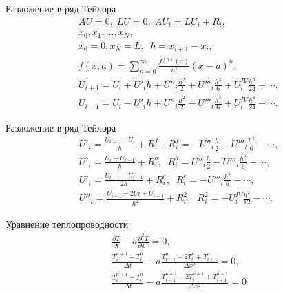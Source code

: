 \documentclass[12pt]{beamer}
\begin{document}
\begin{frame}{Разложение в ряд Тейлора}
\begin{eqnarray}
AU=0,\; LU=0,\; AU_{i}=LU_{i}+R_{i},\\
x_{0}, x_{1}, \dots, x_N,\\
x_{0}=0, x_N=L,\;\; h=x_{i+1}-x_{i},\\
f\left(x, a\right) = \sum\limits_{n=0}^{\infty} \frac{f^{\left(n\right)}\left(a\right)}{n!} \left(x - a\right)^n,\\
U_{i+1}=U_{i}+U'_{i}h+U''_{i}\frac{h^2}{2}+U'''_{i}\frac{h^3}{6}+U^{IV}_{i}\frac{h^4}{24}+\cdots,\\
U_{i-1}=U_{i}-U'_{i}h+U''_{i}\frac{h^2}{2}-U'''_{i}\frac{h^3}{6}+U^{IV}_{i}\frac{h^4}{24}-\cdots.
\end{eqnarray}
\end{frame}

\begin{frame}{Разложение в ряд Тейлора}
\begin{eqnarray}
U'_{i}=\frac{U_{i+1}-U_{i}}{h}+R^f_{i},\;\; R^f_{i}=-U''_{i}\frac{h}{2}-U'''_{i}\frac{h^2}{6}-\cdots,\\
U'_{i}=\frac{U_{i}-U_{i-1}}{h}+R^b_{i},\;\; R^b_{i}=U''_{i}\frac{h}{2}-U'''_{i}\frac{h^2}{6}-\cdots,\\
U'_{i}=\frac{U_{i+1}-U_{i-1}}{2h}+R^c_{i},\;\; R^c_{i}=-U'''_{i}\frac{h^2}{6}-\cdots,\\
U''_{i}=\frac{U_{i+1}-2U{i}+U_{i-1}}{h^2}+R^2_{i},\;\; R^2_{i}=-U^{IV}_{i}\frac{h^2}{12}-\cdots.
\end{eqnarray}
\end{frame}

\begin{frame}{Уравнение теплопроводности}
\begin{eqnarray}
\frac{\partial T}{\partial t} - a \frac{\partial^2 T}{\partial x^2} = 0,\\
\frac{T_i^{n+1} - T_i^{n}}{\Delta t} - a\frac{T_{i-1}^{n} - 2T_i^{n} + T_{i+1}^{n}}{\Delta x^2} = 0,\\
\frac{T_i^{n+1} - T_i^{n}}{\Delta t} - a\frac{T_{i-1}^{n+1} - 2T_i^{n+1} + T_{i+1}^{n+1}}{\Delta x^2} = 0
\end{eqnarray}
\end{frame}
\end{document}

